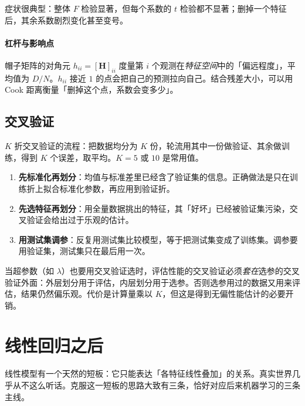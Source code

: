 \documentclass[11pt,a4paper,fontset=windows,zihao=-4]{ctexart}
\newcommand{\bH}{\mathbf{H}}
\begin{document}
症状很典型：整体 $F$ 检验显著，但每个系数的 $t$ 检验都不显著；删掉一个特征后，其余系数剧烈变化甚至变号。

\paragraph{杠杆与影响点}帽子矩阵的对角元 $h_{ii}=[\bH]_{ii}$ 度量第 $i$ 个观测在\emph{特征空间}中的「偏远程度」，平均值为 $D/N$。$h_{ii}$ 接近 $1$ 的点会把自己的预测拉向自己。结合残差大小，可以用 Cook 距离衡量「删掉这个点，系数会变多少」。

\subsection{交叉验证}

$K$ 折交叉验证的流程：把数据均分为 $K$ 份，轮流用其中一份做验证、其余做训练，得到 $K$ 个误差，取平均。$K=5$ 或 $10$ 是常用值。

\begin{warn}[泄漏的三种常见形式]
\begin{enumerate}[label=(\arabic*),leftmargin=1.8em]
  \item \textbf{先标准化再划分}：均值与标准差里已经含了验证集的信息。正确做法是只在训练折上拟合标准化参数，再应用到验证折。
  \item \textbf{先选特征再划分}：用全量数据挑出的特征，其「好坏」已经被验证集污染，交叉验证会给出过于乐观的估计。
  \item \textbf{用测试集调参}：反复用测试集比较模型，等于把测试集变成了训练集。调参要用验证集，测试集只在最后用一次。
\end{enumerate}
\end{warn}

\begin{add}[嵌套交叉验证]
当超参数（如 $\lambda$）也要用交叉验证选时，评估性能的交叉验证必须\emph{套在}选参的交叉验证外面：外层划分用于评估，内层划分用于选参。否则选参用过的数据又用来评估，结果仍然偏乐观。代价是计算量乘以 $K$，但这是得到无偏性能估计的必要开销。
\end{add}


\section{线性回归之后}

线性模型有一个天然的短板：它只能表达「各特征线性叠加」的关系。真实世界几乎从不这么听话。克服这一短板的思路大致有三条，恰好对应后来机器学习的三条主线。
\end{document}

